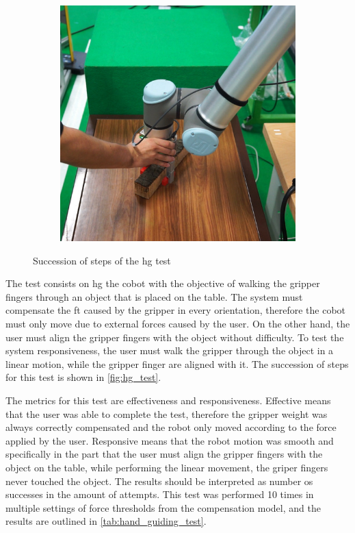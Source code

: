 \begin{figure}[h]
\begin{subfigure}{.2\linewidth}
    \end{subfigure}%
    \begin{subfigure}{.2\linewidth}
        \centering
        \includegraphics[width=.95\linewidth]{figs/chp6/hg_test_4.jpg}
    \end{subfigure}
    \caption{Succession of steps of the \ac{hg} test}
    \label{fig:hg_test}
\end{figure}

\par The test consists on  \ac{hg} the cobot with the objective of walking the gripper fingers through an object that is placed on the table. The system must compensate the \ac{ft} caused by the gripper in every orientation, therefore the cobot must only move due to external forces caused by the user. On the other hand, the user must align the gripper fingers with the object without difficulty. To test the system responsiveness, the user must walk the gripper through the object in a linear motion, while the gripper finger are aligned with it. The succession of steps for this test is shown in \autoref{fig:hg_test}. 

\par The metrics for this test are effectiveness and responsiveness. Effective means that the user was able to complete the test, therefore the gripper weight was always correctly compensated and the robot only moved according to the force applied by the user. Responsive means that the robot motion was smooth and specifically in the part that the user must align the gripper fingers with the object on the table, while performing the linear movement, the griper fingers never touched the object. The results should be interpreted as number os successes in the amount of attempts. This test was performed 10 times in multiple settings of force thresholds from the compensation model, and the results are outlined in \autoref{tab:hand_guiding_test}. 

